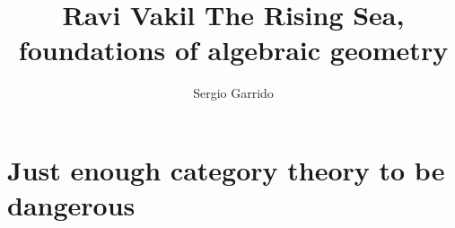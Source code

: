 \documentclass{bookSolutions}
\title{Ravi Vakil The Rising Sea, foundations of algebraic geometry}
\author{Sergio Garrido}
\begin{document}
\tableofcontents
\newpage

\chapter{Just enough category theory to be dangerous}



%
\end{document}
